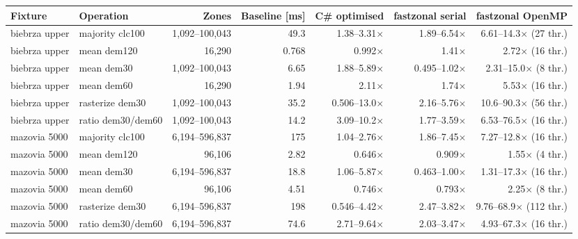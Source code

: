 \begin{tabular}{llrrrrr}
\toprule
Fixture & Operation & Zones & Baseline [ms] & C\# optimised & fastzonal serial & fastzonal OpenMP \\
\midrule
biebrza upper & majority clc100 & 1,092--100,043 & 49.3 & 1.38--3.31$\times$ & 1.89--6.54$\times$ & 6.61--14.3$\times$ (27 thr.) \\
biebrza upper & mean dem120 & 16,290 & 0.768 & 0.992$\times$ & 1.41$\times$ & 2.72$\times$ (16 thr.) \\
biebrza upper & mean dem30 & 1,092--100,043 & 6.65 & 1.88--5.89$\times$ & 0.495--1.02$\times$ & 2.31--15.0$\times$ (8 thr.) \\
biebrza upper & mean dem60 & 16,290 & 1.94 & 2.11$\times$ & 1.74$\times$ & 5.53$\times$ (16 thr.) \\
biebrza upper & rasterize dem30 & 1,092--100,043 & 35.2 & 0.506--13.0$\times$ & 2.16--5.76$\times$ & 10.6--90.3$\times$ (56 thr.) \\
biebrza upper & ratio dem30/dem60 & 1,092--100,043 & 14.2 & 3.09--10.2$\times$ & 1.77--3.59$\times$ & 6.53--76.5$\times$ (16 thr.) \\
mazovia 5000 & majority clc100 & 6,194--596,837 & 175 & 1.04--2.76$\times$ & 1.86--7.45$\times$ & 7.27--12.8$\times$ (16 thr.) \\
mazovia 5000 & mean dem120 & 96,106 & 2.82 & 0.646$\times$ & 0.909$\times$ & 1.55$\times$ (4 thr.) \\
mazovia 5000 & mean dem30 & 6,194--596,837 & 18.8 & 1.06--5.87$\times$ & 0.463--1.00$\times$ & 1.31--17.3$\times$ (16 thr.) \\
mazovia 5000 & mean dem60 & 96,106 & 4.51 & 0.746$\times$ & 0.793$\times$ & 2.25$\times$ (8 thr.) \\
mazovia 5000 & rasterize dem30 & 6,194--596,837 & 198 & 0.546--4.42$\times$ & 2.47--3.82$\times$ & 9.76--68.9$\times$ (112 thr.) \\
mazovia 5000 & ratio dem30/dem60 & 6,194--596,837 & 74.6 & 2.71--9.64$\times$ & 2.03--3.47$\times$ & 4.93--67.3$\times$ (16 thr.) \\
\bottomrule
\end{tabular}
